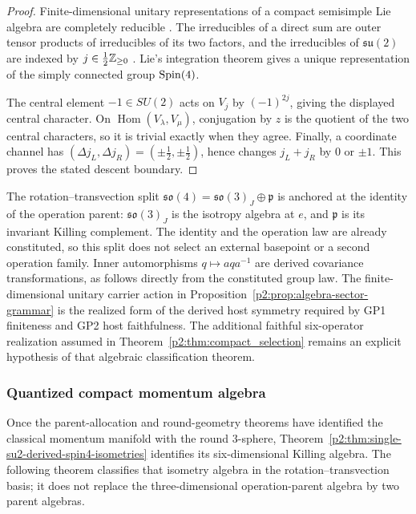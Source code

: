 \documentclass[12pt,a4paper]{article}
\begin{document}
\begin{proof}
Finite-dimensional unitary representations of a compact semisimple Lie
algebra are completely reducible
\cite{fulton1991representation,Hall2015lie}.  The irreducibles of a direct sum
are outer tensor products of irreducibles of its two factors, and the
irreducibles of \(\mathfrak{su}(2)\) are indexed by
\(j\in\tfrac12\mathbb{Z}_{\ge0}\) \cite{fulton1991representation}.  Lie's
integration theorem \cite{Hall2015lie} gives a unique
representation of the simply connected group \(\mathrm{Spin}(4)\).

The central element \(-1\in SU(2)\) acts on \(V_j\) by
\((-1)^{2j}\), giving the displayed central character.  On
\(\operatorname{Hom}(V_\lambda,V_\mu)\), conjugation by \(z\) is the quotient
of the two central characters, so it is trivial exactly when they agree.
Finally, a coordinate channel has
\((\Delta j_L,\Delta j_R)=(\pm\tfrac12,\pm\tfrac12)\), hence changes
\(j_L+j_R\) by \(0\) or \(\pm1\).  This proves the stated descent boundary.
\end{proof}

\begin{remark}
\label{p2:rem:identity-anchored-split}
The rotation--transvection split
\(\mathfrak{so}(4)=\mathfrak{so}(3)_J\oplus\mathfrak p\) is anchored at the
identity of the operation parent: \(\mathfrak{so}(3)_J\) is the isotropy
algebra at \(e\), and \(\mathfrak p\) is its invariant Killing complement.
The identity and the operation law are already constituted, so this split
does not select an external basepoint or a second operation family.  Inner
automorphisms \(q\mapsto aqa^{-1}\) are derived covariance transformations,
as follows directly from the constituted group law.
The finite-dimensional unitary carrier action in
Proposition~\ref{p2:prop:algebra-sector-grammar} is the realized form of the
derived host symmetry required by GP1 finiteness and GP2 host faithfulness.
The additional faithful six-operator realization assumed in
Theorem~\ref{p2:thm:compact_selection} remains an explicit hypothesis of that
algebraic classification theorem.
\end{remark}

\subsubsection{Quantized compact momentum algebra}
\label{p2:subsec:quantized-algebra}

Once the parent-allocation and round-geometry theorems have identified the
classical momentum manifold with the round \(3\)-sphere,
Theorem~\ref{p2:thm:single-su2-derived-spin4-isometries} identifies its
six-dimensional Killing algebra.  The following theorem classifies that
isometry algebra in the rotation--transvection basis; it does not replace the
three-dimensional operation-parent algebra by two parent algebras.
\end{document}
